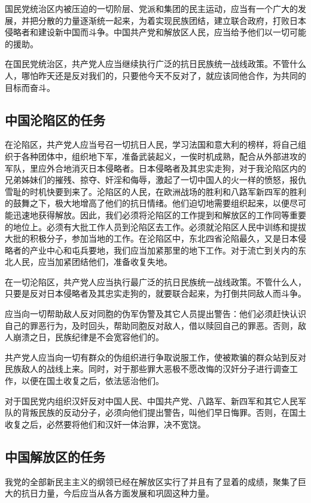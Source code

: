 国民党统治区内被压迫的一切阶层、党派和集团的民主运动，应当有一个广大的发展，并把分散的力量逐渐统一起来，为着实现民族团结，建立联合政府，打败日本侵略者和建设新中国而斗争。中国共产党和解放区人民，应当给予他们以一切可能的援助。

在国民党统治区，共产党人应当继续执行广泛的抗日民族统一战线政策。不管什么人，哪怕昨天还是反对我们的，只要他今天不反对了，就应该同他合作，为共同的目标而奋斗。

\subsection{中国沦陷区的任务}

在沦陷区，共产党人应当号召一切抗日人民，学习法国和意大利的榜样，将自己组织于各种团体中，组织地下军，准备武装起义，一俟时机成熟，配合从外部进攻的军队，里应外合地消灭日本侵略者。日本侵略者及其忠实走狗，对于我沦陷区内的兄弟姊妹们的摧残、掠夺、奸淫和侮辱，激起了一切中国人的火一样的愤怒，报仇雪耻的时机快要到来了。沦陷区的人民，在欧洲战场的胜利和八路军新四军的胜利的鼓舞之下，极大地增高了他们的抗日情绪。他们迫切地需要组织起来，以便尽可能迅速地获得解放。因此，我们必须将沦陷区的工作提到和解放区的工作同等重要的地位上。必须有大批工作人员到沦陷区去工作。必须就沦陷区人民中训练和提拔大批的积极分子，参加当地的工作。在沦陷区中，东北四省沦陷最久，又是日本侵略者的产业中心和屯兵要地，我们应当加紧那里的地下工作。对于流亡到关内的东北人民，应当加紧团结他们，准备收复失地。

在一切沦陷区，共产党人应当执行最广泛的抗日民族统一战线政策。不管什么人，只要是反对日本侵略者及其忠实走狗的，就要联合起来，为打倒共同敌人而斗争。

应当向一切帮助敌人反对同胞的伪军伪警及其它人员提出警告：他们必须赶快认识自己的罪恶行为，及时回头，帮助同胞反对敌人，借以赎回自己的罪恶。否则，敌人崩溃之日，民族纪律是不会宽容他们的。

共产党人应当向一切有群众的伪组织进行争取说服工作，使被欺骗的群众站到反对民族敌人的战线上来。同时，对于那些罪大恶极不愿改悔的汉奸分子进行调查工作，以便在国土收复之后，依法惩治他们。

对于国民党内组织汉奸反对中国人民、中国共产党、八路军、新四军和其它人民军队的背叛民族的反动分子，必须向他们提出警告，叫他们早日悔罪。否则，在国土收复之后，必然要将他们和汉奸一体治罪，决不宽饶。

\subsection{中国解放区的任务}

我党的全部新民主主义的纲领已经在解放区实行了并且有了显着的成绩，聚集了巨大的抗日力量，今后应当从各方面发展和巩固这种力量。

